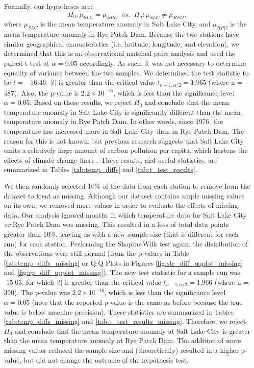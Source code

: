 Formally, our hypotheses are: $$H_{0}: \mu_{SLC} = \mu_{RPD} \;\; vs. \;\; H_{a}: \mu_{SLC} \neq \mu_{RPD},$$ where $\mu_{SLC}$ is the mean temperature anomaly in Salt Lake City, and $\mu_{RPD}$ is the mean temperature anomaly in Rye Patch Dam. Because the two stations have similar geographical characteristics (i.e. latitude, longitude, and elevation), we determined that this is an observational matched pairs analysis and used the paired t-test at $\alpha = 0.05$ accordingly. As such, it was not necessary to determine equality of variance between the two samples. We determined the test statistic to be $t = -16.46$. $|t|$ is greater than the critical value $t_{n-1,\alpha/2} = 1.965$ (where n = 487). Also, the p-value is $2.2 \times 10^{-16}$, which is less than the significance level $\alpha = 0.05$. Based on these results, we reject $H_{0}$ and conclude that the mean temperature anomaly in Salt Lake City is significantly different than the mean temperature anomaly in Rye Patch Dam. In other words, since 1976, the temperature has increased more in Salt Lake City than in Rye Patch Dam. The reason for this is not known, but previous research suggests that Salt Lake City emits a relatively large amount of carbon pollution per capita, which hastens the effects of climate change there \cite{obama_report}. These results, and useful statistics, are summarized in Tables \ref{tab:temp_diffs} and \ref{tab:t_test_results}.

We then randomly selected 10\% of the data from each station to remove from the dataset to treat as missing. Although our dataset contains ample missing values on its own, we removed more values in order to evaluate the effects of missing data. Our analysis ignored months in which temperature data for Salt Lake City \textit{or} Rye Patch Dam was missing. This resulted in a loss of total data points greater than 10\%, leaving us with a new sample size (that is different for each run) for each station. Performing the Shapiro-Wilk test again, the distribution of the observations were still normal (from the p-values in Table \ref{tab:temp_diffs_missing} or Q-Q Plots in Figures \ref{fig:slc_diff_qqplot_missing} and \ref{fig:rp_diff_qqplot_missing}). The new test statistic for a sample run was -15.03, for which $|t|$ is greater than the critical value $t_{n-1,\alpha/2} = 1.966$ (where n = 390). The p-value was $2.2 \times 10^{-16}$, which is less than the significance level $\alpha = 0.05$ (note that the reported p-value is the same as before because the true value is below machine precision). These statistics are summarized in Tables \ref{tab:temp_diffs_missing} and \ref{tab:t_test_results_missing}. Therefore, we reject $H_{0}$ and conclude that the mean temperature anomaly at Salt Lake City is greater than the mean temperature anomaly at Rye Patch Dam. The addition of more missing values reduced the sample size and (theoretically) resulted in a higher p-value, but did not change the outcome of the hypothesis test.